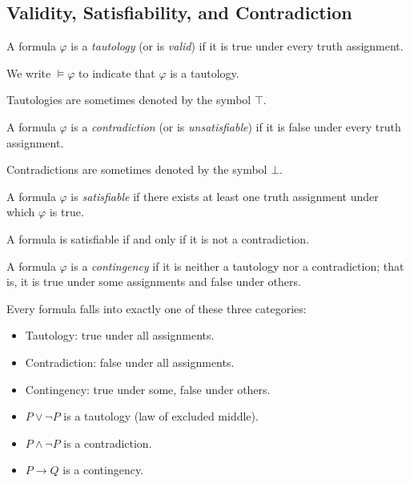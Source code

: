 \subsection{Validity, Satisfiability, and Contradiction}

\begin{definition}[Tautology]
A formula $\varphi$ is a \emph{tautology} (or is \emph{valid}) if it is true
under every truth assignment.

We write $\models \varphi$ to indicate that $\varphi$ is a tautology.

Tautologies are sometimes denoted by the symbol $\top$.
\end{definition}

\begin{definition}[Contradiction]
A formula $\varphi$ is a \emph{contradiction} (or is \emph{unsatisfiable}) if
it is false under every truth assignment.

Contradictions are sometimes denoted by the symbol $\bot$.
\end{definition}

\begin{definition}
A formula $\varphi$ is \emph{satisfiable} if there exists at least one truth
assignment under which $\varphi$ is true.

A formula is satisfiable if and only if it is not a contradiction.
\end{definition}

\begin{definition}[Contingency]
A formula $\varphi$ is a \emph{contingency} if it is neither a tautology nor a
contradiction; that is, it is true under some assignments and false under others.
\end{definition}

\begin{remark}
Every formula falls into exactly one of these three categories:
\begin{itemize}
  \item Tautology: true under all assignments.
  \item Contradiction: false under all assignments.
  \item Contingency: true under some, false under others.
\end{itemize}
\end{remark}

\begin{example}
\begin{itemize}
  \item $P \vee \neg P$ is a tautology (law of excluded middle).
  \item $P \wedge \neg P$ is a contradiction.
  \item $P \rightarrow Q$ is a contingency.
\end{itemize}
\end{example}


